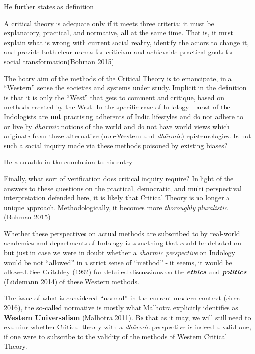 He further states as definition
\begin{myquote}
A critical theory is adequate only if it meets three criteria: it must be explanatory, practical, and normative, all at the same time. That is, it must explain what is wrong with current social reality, identify the actors to change it, and provide both clear norms for criticism and achievable practical goals for social transformation\hfill (Bohman 2015)
\end{myquote}

\newpage

The hoary aim of the methods of the Critical Theory is to emancipate, in a ``Western'' sense the societies and systems under study. Implicit in the definition is that it is only the ``West'' that gets to comment and critique, based on methods created by the West. In the specific case of Indology - most of the Indologists are {\bf not} practising adherents of Indic lifestyles and do not adhere to or live by {\sl dhārmic} notions of the world and do not have world views which originate from these alternative (non-Western and {\sl dhārmic}) epistemologies. Is not such a social inquiry made via these methods poisoned by existing biases?

He also adds in the conclusion to his entry
\begin{myquote}
Finally, what sort of verification does critical inquiry require? In light of the answers to these questions on the practical, democratic, and multi perspectival interpretation defended here, it is likely that Critical Theory is no longer a unique approach. Methodologically, it becomes more {\sl thoroughly pluralistic}.\hfill (Bohman 2015)
\end{myquote}

Whether these perspectives on actual methods are subscribed to by real-world  academics and departments of Indology is something that could be debated on - but just in case we were in doubt whether a {\sl dhārmic perspective} on Indology would be  not ``allowed'' in a strict sense of ``method'' - it seems, it would be allowed. See Critchley (1992) for detailed discussions on the {{\sl\bfseries ethics}\relax} and {{\sl\bfseries politics}\relax} (Lüdemann 2014) of these Western methods.

The issue of what is considered ``normal'' in the current modern context (circa 2016), the so-called normative is mostly what Malhotra explicitly identifies as {\bf Western Universalism} (Malhotra 2011). Be that as it may, we will still need to examine whether Critical theory with a {\sl dhārmic} perspective is indeed a valid one, if one were to subscribe to the validity of the methods of Western Critical Theory.

